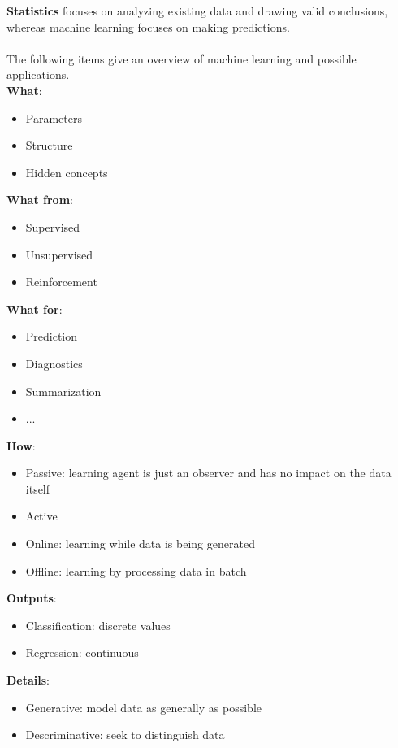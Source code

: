 \documentclass{report}
\begin{document}
{\bf Statistics} focuses on analyzing existing data and drawing valid conclusions, whereas machine learning focuses on making predictions.
\\
\\
The following items give an overview of machine learning and possible applications.
\\
{\bf What}:
\begin{itemize}
  \item Parameters
  \item Structure
  \item Hidden concepts
\end{itemize}

{\bf What from}:
\begin{itemize}
  \item Supervised
  \item Unsupervised
  \item Reinforcement
\end{itemize}

{\bf What for}:
\begin{itemize}
  \item Prediction
  \item Diagnostics
  \item Summarization
  \item ...
\end{itemize}

{\bf How}:
\begin{itemize}
  \item Passive: learning agent is just an observer and has no impact on the data itself
  \item Active
  \item Online: learning while data is being generated
  \item Offline: learning by processing data in batch
\end{itemize}

{\bf Outputs}:
\begin{itemize}
  \item Classification: discrete values
  \item Regression: continuous
\end{itemize}

{\bf Details}:
\begin{itemize}
  \item Generative: model data as generally as possible
  \item Descriminative: seek to distinguish data
\end{itemize}
\end{document}
